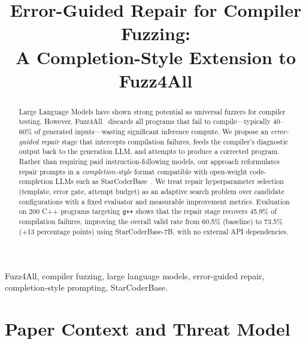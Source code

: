\documentclass[conference]{IEEEtran}
\begin{document}
\title{Error-Guided Repair for Compiler Fuzzing:\\A Completion-Style Extension to Fuzz4All}

\author{
}

\maketitle

\begin{IEEEkeywords}
Fuzz4All, compiler fuzzing, large language models, error-guided repair, completion-style prompting, StarCoderBase.
\end{IEEEkeywords}

\begin{abstract}
Large Language Models have shown strong potential as universal fuzzers for compiler testing. However, Fuzz4All~\cite{xia2024fuzz4all} discards all programs that fail to compile---typically 40--60\% of generated inputs---wasting significant inference compute. We propose an \emph{error-guided repair} stage that intercepts compilation failures, feeds the compiler's diagnostic output back to the generation LLM, and attempts to produce a corrected program. Rather than requiring paid instruction-following models, our approach reformulates repair prompts in a \emph{completion-style} format compatible with open-weight code-completion LLMs such as StarCoderBase~\cite{starcoder}. We treat repair hyperparameter selection (template, error gate, attempt budget) as an adaptive search problem over candidate configurations with a fixed evaluator and measurable improvement metrics. Evaluation on 200 C++ programs targeting \texttt{g++} shows that the repair stage recovers 45.9\% of compilation failures, improving the overall valid rate from 60.5\% (baseline) to 73.5\% (+13 percentage points) using StarCoderBase-7B, with no external API dependencies.
\end{abstract}

\section{Paper Context and Threat Model}
\end{document}
